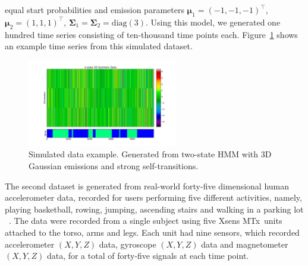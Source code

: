 \documentclass[letterpaper]{article}
\begin{document}
equal start probabilities and emission parameters $\mathbf{\mu}_1 = (-1, -1, -1)^\top$, $\mathbf{\mu}_2 = (1, 1, 1)^\top$, $\mathbf{\Sigma}_1 = \mathbf{\Sigma}_2 = \text{diag}(3)$. Using this model, we generated one hundred time series consisting of ten-thousand time points each. Figure~\ref{fig:simulated} shows an example time series from this simulated dataset.
\vspace{-0.1cm}
\begin{figure}[htbp]
  \centering
  \vspace{-0.1cm}
    \includegraphics[width=1.\linewidth,
    height = 1.5in]{images/3D_synthetic_data_example.pdf}    
    \vspace{-1cm}
  \caption{\small{Simulated data example. Generated from two-state HMM with 3D
  Gaussian emissions and strong self-transitions.}}
  \label{fig:simulated}
  \vspace{-0.1cm}
\end{figure}
\vspace{-0.1cm}
The second dataset is generated from real-world forty-five dimensional human accelerometer data, recorded for users performing five different activities, namely, playing basketball, rowing, jumping, ascending stairs and walking in a parking lot ~\cite{Altun:2010:CSC:1823245.1823314}. The data were recorded from a single subject using five Xsens MTx\texttrademark\ units attached to the torso, arms and legs. Each unit had nine sensors, which recorded accelerometer $(X, Y, Z)$ data, gyroscope $(X,Y,Z)$ data and magnetometer $(X,Y,Z)$ data, for a total of forty-five signals at each time point.
\end{document}

